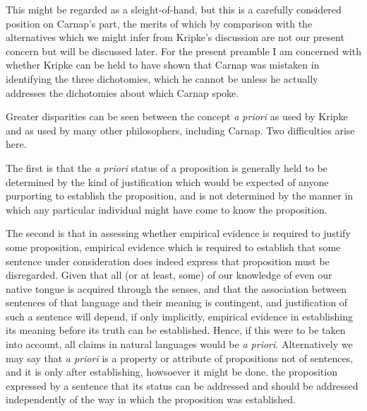 This might be regarded as a sleight-of-hand, but this is a carefully
considered position on Carnap's part, the merits of which by comparison
with the alternatives which we might infer from Kripke's discussion are
not our present concern but will be discussed later.
For the present preamble I am concerned with whether Kripke can be held
to have shown that Carnap was mistaken in identifying the three dichotomies,
which he cannot be unless he actually addresses the dichotomies about
which Carnap spoke.

Greater disparities can be seen between the concept \emph{a priori} as used
by Kripke and as used by many other philosophers, including Carnap.
Two difficulties arise here.

The first is that the \emph{a priori} status of a proposition is generally
held to be determined by the kind of justification which would be expected
of anyone purporting to establish the proposition, and is not determined
by the manner in which any particular individual might have come to know
the proposition.

The second is that in assessing whether empirical evidence is required
to justify some proposition, empirical evidence which is required to establish
that some sentence under consideration does indeed express that proposition
must be disregarded.
Given that all (or at least, some) of our knowledge of even our native tongue
is acquired through the senses, and that the association between sentences
of that language and their meaning is contingent, and justification of such
a sentence will depend, if only implicitly, empirical evidence in establishing
its meaning before its truth can be established.
Hence, if this were to be taken into account, all claims in natural languages
would be \emph{a priori}.
Alternatively we may say that \emph{a priori} is a property or attribute of
propositions not of sentences, and it is only after establishing, howsoever it might be done.
the proposition expressed by a sentence that its status can be addressed
and should be addressed independently of the way in which the proposition
was established.

